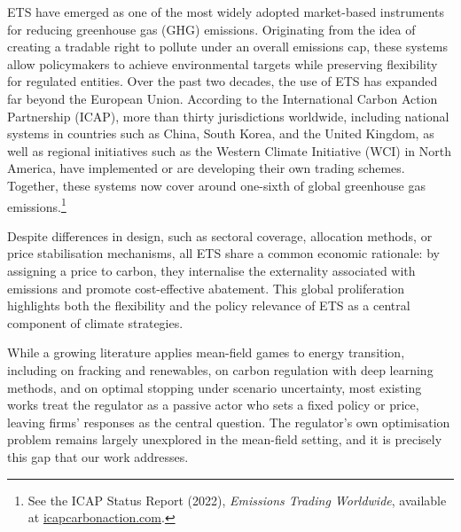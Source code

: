 \documentclass[11pt,twoside]{amsart}
\theoremstyle{definition}
\numberwithin{equation}{section}
\begin{document}
ETS have emerged as one of the most widely adopted market-based instruments for reducing greenhouse gas (GHG) emissions. Originating from the idea of creating a tradable right to pollute under an overall emissions cap, these systems allow policymakers to achieve environmental targets while preserving flexibility for regulated entities. Over the past two decades, the use of ETS has expanded far beyond the European Union. According to the International Carbon Action Partnership (ICAP), more than thirty jurisdictions worldwide, including national systems in countries such as China, South Korea, and the United Kingdom, as well as regional initiatives such as the Western Climate Initiative (WCI) in North America, have implemented or are developing their own trading schemes. Together, these systems now cover around one-sixth of global greenhouse gas emissions.\footnote{See the ICAP Status Report (2022), \emph{Emissions Trading Worldwide}, available at \href{https://icapcarbonaction.com/en/publications/emissions-trading-worldwide-2022-icap-status-report}{icapcarbonaction.com}.}

Despite differences in design, such as sectoral coverage, allocation methods, or price stabilisation mechanisms, all ETS share a common economic rationale: by assigning a price to carbon, they internalise the externality associated with emissions and promote cost-effective abatement. This global proliferation highlights both the flexibility and the policy relevance of ETS as a central component of climate strategies. 

While a growing literature applies mean-field games to energy transition, including \cite{chan2017fracking} on fracking and renewables, \cite{carmona2022mean} on carbon regulation with deep learning methods, and \cite{dumitrescu2024energy} on optimal stopping under scenario uncertainty, most existing works treat the regulator as a passive actor who sets a fixed policy or price, leaving firms' responses as the central question. The regulator's own optimisation problem remains largely unexplored in the mean-field setting, and it is precisely this gap that our work addresses.
\end{document}
